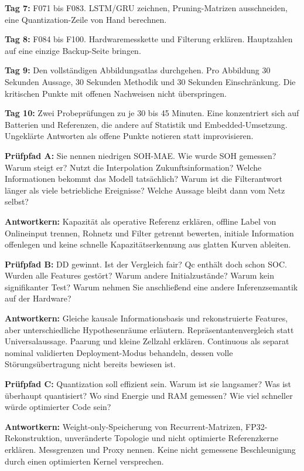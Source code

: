 \documentclass[11pt,a4paper]{article}
\newcommand{\question}[1]{\Needspace{6\baselineskip}\par\vspace{6pt}{\large\bfseries\color{accent}#1}\par\nobreak}
\begin{document}
\textbf{Tag 7:} F071 bis F083. LSTM/\allowbreak{}GRU zeichnen, Pruning-Matrizen ausschneiden, eine Quantization-Zeile von Hand berechnen.

\textbf{Tag 8:} F084 bis F100. Hardwaremesskette und Filterung erklären. Hauptzahlen auf eine einzige Backup-Seite bringen.

\textbf{Tag 9:} Den vollständigen Abbildungsatlas durchgehen. Pro Abbildung 30 Sekunden Aussage, 30 Sekunden Methodik und 30 Sekunden Einschränkung. Die kritischen Punkte mit offenen Nachweisen nicht überspringen.

\textbf{Tag 10:} Zwei Probeprüfungen zu je 30 bis 45 Minuten. Eine konzentriert sich auf Batterien und Referenzen, die andere auf Statistik und Embedded-Umsetzung. Ungeklärte Antworten als offene Punkte notieren statt improvisieren.

\question{Simulation einer kritischen Prüfung}
\textbf{Prüfpfad A:} Sie nennen niedrigen SOH-MAE. Wie wurde SOH gemessen? Warum steigt er? Nutzt die Interpolation Zukunftsinformation? Welche Informationen bekommt das Modell tatsächlich? Warum ist die Filterantwort länger als viele betriebliche Ereignisse? Welche Aussage bleibt dann vom Netz selbst?

\textbf{Antwortkern:} Kapazität als operative Referenz erklären, offline Label von Onlineinput trennen, Rohnetz und Filter getrennt bewerten, initiale Information offenlegen und keine schnelle Kapazitätserkennung aus glatten Kurven ableiten.

\textbf{Prüfpfad B:} DD gewinnt. Ist der Vergleich fair? Qc enthält doch schon SOC. Wurden alle Features gestört? Warum andere Initialzustände? Warum kein signifikanter Test? Warum nehmen Sie anschließend eine andere Inferenzsemantik auf der Hardware?

\textbf{Antwortkern:} Gleiche kausale Informationsbasis und rekonstruierte Features, aber unterschiedliche Hypothesenräume erläutern. Repräsentantenvergleich statt Universalaussage. Paarung und kleine Zellzahl erklären. Continuous als separat nominal validierten Deployment-Modus behandeln, dessen volle Störungsübertragung nicht bereits bewiesen ist.

\textbf{Prüfpfad C:} Quantization soll effizient sein. Warum ist sie langsamer? Was ist überhaupt quantisiert? Wo sind Energie und RAM gemessen? Wie viel schneller würde optimierter Code sein?

\textbf{Antwortkern:} Weight-only-Speicherung von Recurrent-Matrizen, FP32-Rekonstruktion, unveränderte Topologie und nicht optimierte Referenzkerne erklären. Messgrenzen und Proxy nennen. Keine nicht gemessene Beschleunigung durch einen optimierten Kernel versprechen.
\end{document}
